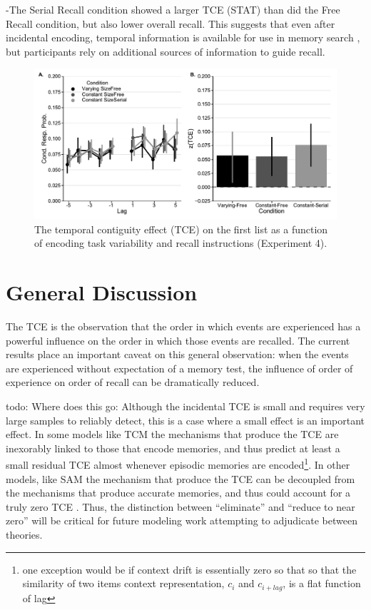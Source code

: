 \documentclass[man,natbib,floatsintext]{apa6} %
\begin{document}
-The Serial Recall condition showed a larger TCE (STAT) than did the Free Recall condition, but also lower overall recall. This suggests that even after incidental encoding, temporal information is available for use in memory search \cite{Nair}, but participants rely on additional sources of information to guide recall.



\begin{figure}%
\includegraphics{figures/E4_crp_list1.pdf}
\caption{The temporal contiguity effect (TCE) on the first list as a function of encoding task variability and recall instructions (Experiment 4). \paneltext}
\label{E4_crp_list1}
\end{figure}

\color{black}





\section{General Discussion}
\color{red}
The TCE is the observation that the order in which events are experienced has a powerful influence on the order in which those events are recalled. The current results place an important caveat on this general observation: when the events are experienced without expectation of a memory test, the influence of order of experience on order of recall can be dramatically reduced.  


todo: Where does this go:
\label{zerovsnear}
Although the incidental TCE is small and requires very large samples to reliably detect, this is a case where a small effect is an important effect. In some models like TCM the mechanisms that produce the TCE are inexorably linked to those that encode memories, and thus predict at least a small residual TCE almost whenever episodic memories are encoded\footnote{one exception would be if context drift is essentially zero so that so that the similarity of two items context representation, $c_i$ and $c_{i+lag}$, is a flat function of lag}. In other models, like SAM the mechanism that produce the TCE can be decoupled from the mechanisms that produce accurate memories, and thus could account for a truly zero TCE \cite{malmberg}. Thus, the distinction between ``eliminate'' and ``reduce to near zero'' will be critical for future modeling work attempting to adjudicate between theories. 
\end{document}
